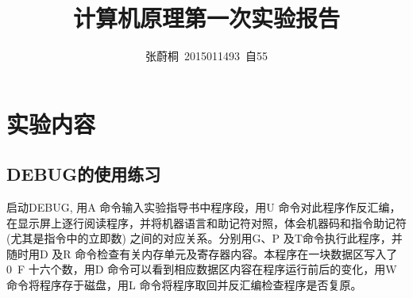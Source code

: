 \documentclass[UTF8,a4paper]{ctexart}
\title{计算机原理第一次实验报告}
\author{张蔚桐\ 2015011493\ 自55}
\begin{document}
\maketitle
\section{实验内容}
\subsection{DEBUG的使用练习}
启动DEBUG, 用A 命令输入实验指导书中程序段，用U 命令对此程序作反汇编，在显示屏上逐行阅读程序，并将机器语言和助记符对照，体会机器码和指令助记符(尤其是指令中的立即数) 之间的对应关系。分别用G、P 及T命令执行此程序，并随时用D 及R 命令检查有关内存单元及寄存器内容。本程序在一块数据区写入了0~F 十六个数，用D 命令可以看到相应数据区内容在程序运行前后的变化，用W 命令将程序存于磁盘，用L 命令将程序取回并反汇编检查程序是否复原。
\end{document}
